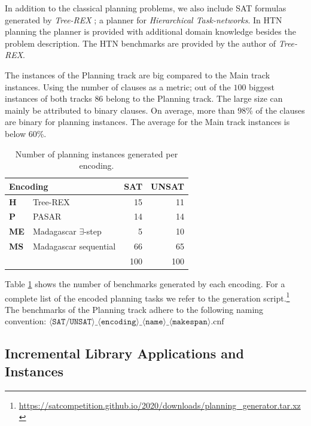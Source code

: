 \documentclass{elsarticle}
\begin{document}
In addition to the classical planning problems, we also include SAT formulas
generated by \emph{Tree-REX} \cite{TreeRex19}; a planner for \emph{Hierarchical
  Task-networks}. In HTN planning the planner is provided with additional domain
knowledge besides the problem description. The HTN benchmarks are provided by
the author of \emph{Tree-REX}.

The instances of the Planning track are big compared to the Main track
instances. Using the number of clauses as a metric; out of the $100$ biggest
instances of both tracks
$86$ belong to the Planning track. The large size can mainly be attributed to
binary clauses. On average, more than $98$\% of the clauses are binary for
planning instances. The average for the Main track instances is below $60$\%.

\begin{table}[t]
\centering\small
\begin{tabular}{llrr}
\multicolumn{2}{l}{Encoding} & SAT& UNSAT\\
\hline\arrayrulecolor{lightgray}
\textbf{H}  & Tree-REX & 15 & 11\\
\textbf{P}  & PASAR & 14 & 14\\
\textbf{ME} & Madagascar $\exists$-step & 5 & 10\\
\textbf{MS} & Madagascar sequential & 66 & 65\\
\hline
&& 100 & 100\\
\end{tabular}
\label{tab:planningBenchmarkDist}
\caption{Number of planning instances generated per encoding.}
\end{table}

Table \ref{tab:planningBenchmarkDist} shows the number of benchmarks generated
by each encoding. 
For a complete list of the encoded planning tasks we refer to the
generation script.\footnote{\url{https://satcompetition.github.io/2020/downloads/planning_generator.tar.xz}} 
The benchmarks of the Planning track adhere to the following naming convention:
${\langle \texttt{SAT/UNSAT} \rangle\_\langle \texttt{encoding} \rangle\_\langle
  \texttt{name} \rangle\_\langle \texttt{makespan}
  \rangle\text{.cnf}}$

\subsection{Incremental Library Applications and Instances}
\end{document}
